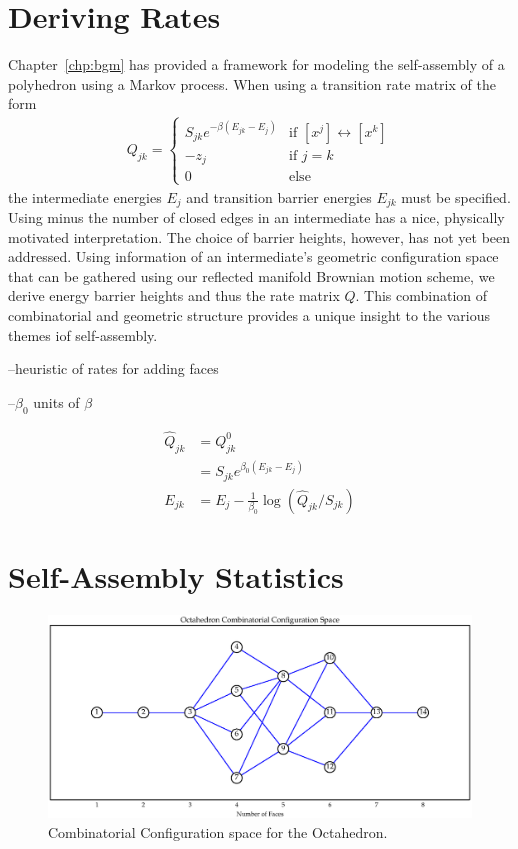 \section{Deriving Rates}

Chapter~\ref{chp:bgm} has provided a framework for modeling the self-assembly of a polyhedron using a Markov process. When using a transition rate matrix of the form 
\begin{align}
  \label{eq:Qdef_rep}
  Q_{jk} =
  \begin{cases}
   S_{jk}e^{-\beta\left(E_{jk} - E_{j}\right)} & \text{if } [x^j] \leftrightarrow [x^k]  \\
   -z_j       & \text{if } j = k \\
   0 & \text{else}
  \end{cases}
\end{align}
the intermediate energies $E_j$ and transition barrier energies $E_{jk}$ must be specified. Using minus the number of closed edges in an intermediate has a nice, physically motivated interpretation. The choice of barrier heights, however, has not yet been addressed. Using information of an intermediate's geometric configuration space that can be gathered using our reflected manifold Brownian motion scheme, we derive energy barrier heights and thus the rate matrix $Q$. This combination of combinatorial and geometric structure provides a unique insight to the various themes iof self-assembly.

--heuristic of rates for adding faces 

--$\beta_0$ units of $\beta$
 
\begin{align}
\hat{Q}_{jk} &= Q^0_{jk} \\
	&= S_{jk}e^{\beta_0(E_{jk} - E_j)} \\
E_{jk} &= E_j-\frac{1}{\beta_0}\log\left(\hat{Q}_{jk}/S_{jk}\right)
\end{align}

\section{Self-Assembly Statistics}



\begin{figure}[ht]
\label{fig:OctaCCS}
\centering
  \includegraphics[scale=0.6]{images/octahedron_ccs.eps}
\caption{Combinatorial Configuration space for the Octahedron.}
\end{figure}

